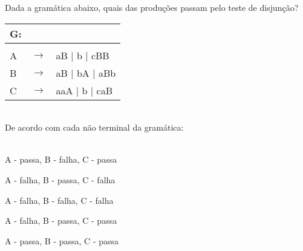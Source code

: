 \question[10] 

Dada a gramática abaixo, quais das produções passam pelo teste de disjunção?\\
\begin{tabular}{|l c l}
	G: & & \\
	\hline \\
	A & $\rightarrow$ & aB | b | cBB \\
    B & $\rightarrow$ & aB | bA | aBb \\
	C & $\rightarrow$ & aaA | b | caB \\
\end{tabular}
\\
De acordo com cada não terminal da gramática:\\
\\
\begin{choices}
\item A - passa, B - falha, C - passa %
\item A - falha, B - passa, C - falha
\item A - falha, B - falha, C - falha
\item A - falha, B - passa, C - passa
\item A - passa, B - passa, C - passa
\end{choices}
\answerline

